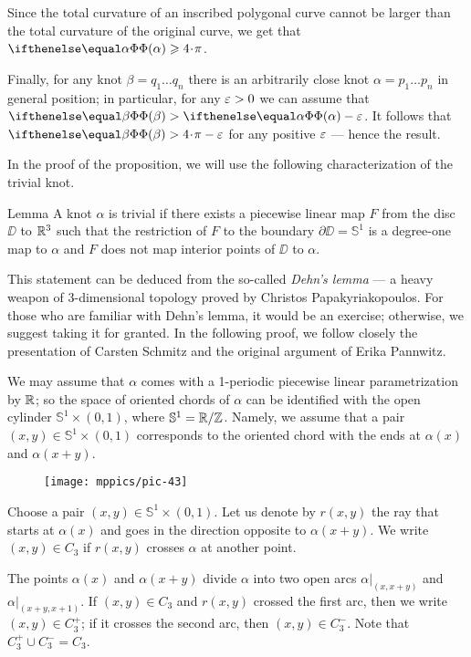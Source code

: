 Since the total curvature of an inscribed polygonal curve cannot be larger than the total curvature of the original curve, we get that $\tc{\alpha}\z\ge 4\cdot\pi$.

Finally, for any knot $\beta=q_1\dots q_n$ there is an arbitrarily close knot $\alpha=p_1\dots p_n$ in general position;
in particular, for any $\varepsilon>0$ we can assume that $\tc{\beta}>\tc\alpha-\eps$.
It follows that $\tc{\beta}>4\cdot\pi-\eps$ for any positive $\varepsilon$ --- hence the result.
\qeds

In the proof of the proposition, we will use the following characterization of the trivial knot.

\begin{thm}{Lemma}
A knot $\alpha$ is trivial if there exists a piecewise linear map $F$ from the disc $\DD$ to $\mathbb{R}^3$ such that the  restriction of $F$ to the boundary $\partial\DD=\mathbb{S}^1$ is a degree-one map to $\alpha$ and $F$ does not map interior points of $\DD$ to $\alpha$.
\end{thm}

This statement can be deduced from the so-called \textit{Dehn's lemma} --- a heavy weapon of 3-dimensional topology proved by Christos Papakyriakopoulos.
For those who are familiar with Dehn's lemma, it would be an exercise; otherwise, we suggest taking it for granted.
In the following proof, we follow closely the presentation of Carsten Schmitz \cite{schmitz} and the original argument of Erika Pannwitz.

We may assume that $\alpha$ comes with a 1-periodic piecewise linear parametrization by $\mathbb{R}$;
so the space of oriented chords of $\alpha$ can be identified with the open cylinder $\mathbb{S}^1\times (0,1)$, where $\mathbb{S}^1=\mathbb{R}/\mathbb{Z}$.
Namely, we assume that a pair $(x,y)\in \mathbb{S}^1\times (0,1)$ corresponds to the oriented chord with the ends at $\alpha(x)$ and $\alpha(x+y)$.

\begin{wrapfigure}{r}{42 mm}
\vskip-0mm
\centering
\texttt{[image: mppics/pic-43]}
\vskip0mm
\end{wrapfigure}

Choose a pair $(x,y)\in \mathbb{S}^1\times (0,1)$.
Let us denote by $r(x,y)$ the ray that starts at $\alpha(x)$ and goes in the direction opposite to $\alpha(x+y)$.
We write $(x,y)\in C_3$ if $r(x,y)$ crosses $\alpha$ at another point.

The points $\alpha(x)$ and $\alpha(x+y)$ divide $\alpha$ into two open arcs $\alpha|_{(x,x+y)}$ and $\alpha|_{(x+y,x+1)}$.
If $(x,y)\in C_3$ and $r(x,y)$ crossed the first arc, then we write $(x,y)\in C_3^+$;
if it crosses the second arc, then $(x,y)\in C_3^-$.
Note that $C_3^+\cup C_3^-=C_3$.

